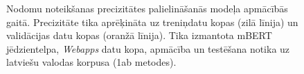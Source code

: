 \begin{figure}[h] 
   \centering
   \caption{Nodomu noteikšanas precizitātes palielināšanās modeļa apmācībās gaitā. Precizitāte tika aprēķināta uz treniņdatu kopas (zilā līnija) un validācijas datu kopas (oranžā līnija). Tika izmantota mBERT jēdzientelpa, \textit{Webapps} datu kopa, apmācība un testēšana notika uz latviešu valodas korpusa (1ab metodes).} 
   \label{fig:webapps-bert}
\end{figure}


